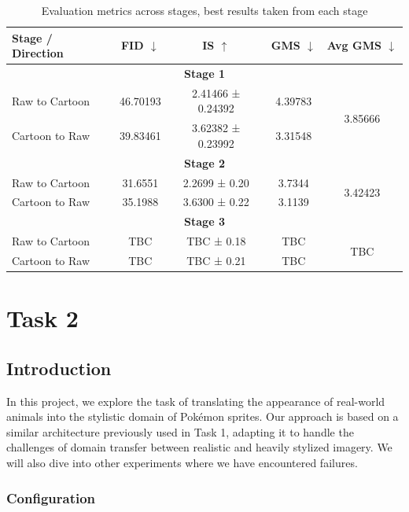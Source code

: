 \documentclass[twoside,english,notitlepage]{report}
\begin{document}
\begin{table}[h]
    \centering
    \begin{tabular}{|l|c|c|c|c|}
    \hline
    \textbf{Stage / Direction} & \textbf{FID} $\downarrow$ & \textbf{IS} $\uparrow$ & \textbf{GMS} $\downarrow$ & \textbf{Avg GMS} $\downarrow$ \\
    \hline
    \multicolumn{5}{|c|}{\textbf{Stage 1}} \\
    \hline
    Raw to Cartoon     & 46.70193     & 2.41466 ± 0.24392   & 4.39783    & \multirow{2}{*}{3.85666} \\
    Cartoon to Raw     & 39.83461         & 3.62382 ± 0.23992        & 3.31548        &            \\
    \hline
    \multicolumn{5}{|c|}{\textbf{Stage 2}} \\
    \hline
    Raw to Cartoon     & 31.6551     & 2.2699 ± 0.20   & 3.7344    & \multirow{2}{*}{3.42423} \\
    Cartoon to Raw     & 35.1988     & 3.6300 ± 0.22   & 3.1139    &            \\
    \hline
    \multicolumn{5}{|c|}{\textbf{Stage 3}} \\
    \hline
    Raw to Cartoon     & TBC     & TBC ± 0.18   & TBC    & \multirow{2}{*}{TBC} \\
    Cartoon to Raw     & TBC     & TBC ± 0.21   & TBC    &            \\
    \hline
    \end{tabular}
    \caption{Evaluation metrics across stages, best results taken from each stage}
    \label{tab:staged-eval}
\end{table}



\chapter{Task 2}
\section{Introduction}
In this project, we explore the task of translating the appearance of real-world animals into the stylistic domain of Pokémon sprites. Our approach is based on a similar architecture previously used in Task 1, adapting it to handle the challenges of domain transfer between realistic and heavily stylized imagery. We will also dive into other experiments where we have encountered failures.

\subsection{Configuration}\label{task2:configuration}
\end{document}
